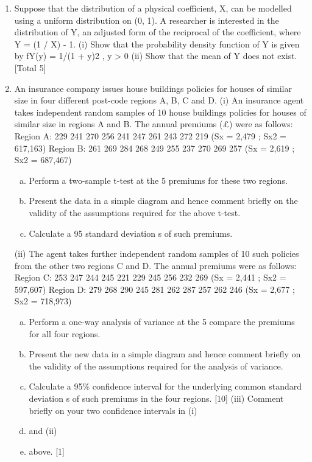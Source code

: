 \documentclass[a4paper,12pt]{article}
\begin{document}
\begin{enumerate}
\item Suppose that the distribution of a physical coefficient, X, can be modelled
using a uniform distribution on (0, 1). A researcher is interested in the
distribution of Y, an adjusted form of the reciprocal of the coefficient, where Y
= (1 / X) - 1.
(i) Show that the probability density function of Y is given by
fY(y) = 1/(1 + y)2 , y > 0 
(ii) Show that the mean of Y does not exist. 
[Total 5]
\item An insurance company issues house buildings policies for houses of similar
size in four different post-code regions A, B, C and D.
(i) An insurance agent takes independent random samples of 10 house
buildings policies for houses of similar size in regions A and B. The
annual premiums (£) were as follows:
Region A: 229 241 270 256 241 247 261 243 272 219
(Sx = 2,479 ; Sx2 = 617,163)
Region B: 261 269 284 268 249 255 237 270 269 257
(Sx = 2,619 ; Sx2 = 687,467)
\begin{enumerate}[(a)]
\item Perform a two-sample t-test at the 5%
premiums for these two regions.
\item Present the data in a simple diagram and hence comment briefly
on the validity of the assumptions required for the above t-test.
\item Calculate a 95%
standard deviation s of such premiums. 
\end{enumerate}
(ii) The agent takes further independent random samples of 10 such
policies from the other two regions C and D. The annual premiums
were as follows:
Region C: 253 247 244 245 221 229 245 256 232 269
(Sx = 2,441 ; Sx2 = 597,607)
Region D: 279 268 290 245 281 262 287 257 262 246
(Sx = 2,677 ; Sx2 = 718,973)
\begin{enumerate}[(a)]
\item Perform a one-way analysis of variance at the 5%
compare the premiums for all four regions.
\item Present the new data in a simple diagram and hence comment
briefly on the validity of the assumptions required for the
analysis of variance.
\item Calculate a 95\% confidence interval for the underlying common
standard deviation s of such premiums in the four regions. [10]
(iii) Comment briefly on your two confidence intervals in (i)\item and (ii)\item
above. [1]
\end{enumerate}


\end{enumerate}
\end{document}
